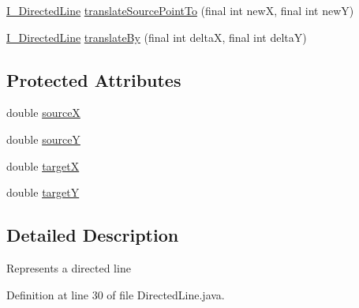 \begin{DoxyCompactItemize}
\item 
\hyperlink{interfaceorg_1_1tzi_1_1use_1_1gui_1_1views_1_1diagrams_1_1util_1_1_i___directed_line}{I\-\_\-\-Directed\-Line} \hyperlink{classorg_1_1tzi_1_1use_1_1gui_1_1views_1_1diagrams_1_1util_1_1_directed_line_a5632992a1c5252fa7076c920bb52151e}{translate\-Source\-Point\-To} (final int new\-X, final int new\-Y)
\item 
\hyperlink{interfaceorg_1_1tzi_1_1use_1_1gui_1_1views_1_1diagrams_1_1util_1_1_i___directed_line}{I\-\_\-\-Directed\-Line} \hyperlink{classorg_1_1tzi_1_1use_1_1gui_1_1views_1_1diagrams_1_1util_1_1_directed_line_a9569d3ac14b29c1428ca423cecbe2257}{translate\-By} (final int delta\-X, final int delta\-Y)
\end{DoxyCompactItemize}
\subsection*{Protected Attributes}
\begin{DoxyCompactItemize}
\item 
double \hyperlink{classorg_1_1tzi_1_1use_1_1gui_1_1views_1_1diagrams_1_1util_1_1_directed_line_a95565106a3a1ccfd0b6bd2646947e3d3}{source\-X}
\item 
double \hyperlink{classorg_1_1tzi_1_1use_1_1gui_1_1views_1_1diagrams_1_1util_1_1_directed_line_a301e913cfddf79f92d6f8d4eb9676fdb}{source\-Y}
\item 
double \hyperlink{classorg_1_1tzi_1_1use_1_1gui_1_1views_1_1diagrams_1_1util_1_1_directed_line_a656fcd747f02710cb526bb49f9ba3a19}{target\-X}
\item 
double \hyperlink{classorg_1_1tzi_1_1use_1_1gui_1_1views_1_1diagrams_1_1util_1_1_directed_line_ac5e07022c9699c06c30232bd14d09caf}{target\-Y}
\end{DoxyCompactItemize}


\subsection{Detailed Description}
Represents a directed line 

Definition at line 30 of file Directed\-Line.\-java.



